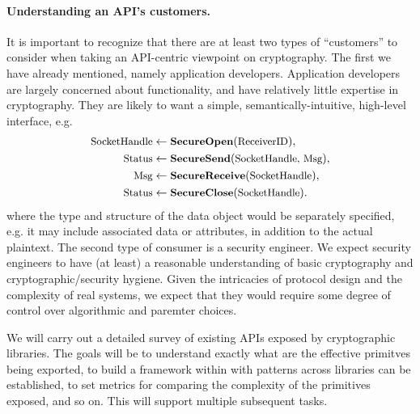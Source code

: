 \paragraph{Understanding an API's customers. }
It is important to recognize that there are at least two types of ``customers''
to consider when taking an API-centric viewpoint on cryptography. The first we
have already mentioned, namely application developers. Application developers
are largely concerned about functionality, and have relatively little expertise
in cryptography. They are likely to want a simple, semantically-intuitive,
high-level interface, e.g.
\begin{align*}
\textrm{\small SocketHandle}&\gets\textrm{\small\bf SecureOpen}(\textrm{\small ReceiverID}), \\
\textrm{\small Status}&\gets\textrm{\small\bf SecureSend}(\textrm{\small SocketHandle, Msg}),\\
\textrm{\small Msg}&\gets\textrm{\small\bf SecureReceive}(\textrm{\small SocketHandle}), \\
\textrm{\small Status}&\gets\textrm{\small\bf SecureClose}(\textrm{\small SocketHandle}).
\end{align*}
%
where the type and structure of the data object  would be
separately specified, e.g. it may include associated data or attributes, in
addition to the actual plaintext.
%
%
The second type of consumer is a security engineer. We expect security engineers
to have (at least) a reasonable understanding of basic cryptography and
cryptographic/security hygiene. Given the intricacies of
protocol design and the complexity of real systems, we expect that they would
require some degree of control over algorithmic and paremter choices.
%
 
\begin{task}
  We will carry out a detailed survey of existing APIs exposed by
  cryptographic libraries.  The goals will be to understand exactly
  what are the effective primitves being exported, to build a
  framework within with patterns across libraries can be established,
  to set metrics for comparing the complexity of the primitives
  exposed, and so on.  This will support multiple subsequent
  tasks.
\end{task}

